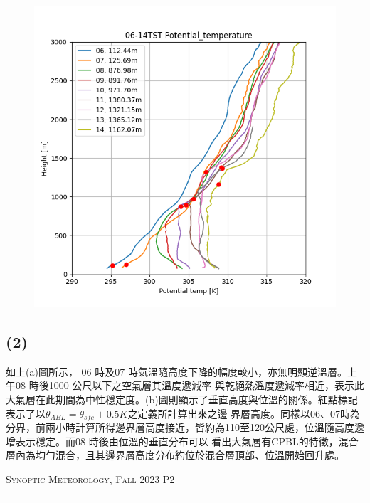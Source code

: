 \documentclass{article}
\begin{document}
\begin{CJK*}{UTF8}{bsmi}
\begin{figure}[!htbp]
{\begin{minipage}[t]{0.5\linewidth}
    \includegraphics[scale=0.47]{1_b.png}
    \end{minipage}%
    }%
\end{figure}



\subsection*{(2)}
\begin{spacing}{2}
    \begin{large}
        \qquad \;如上(a)圖所示， 06 時及07 時氣溫隨高度下降的幅度較小，亦無明顯逆溫層。上午08 時後1000 公尺以下之空氣層其溫度遞減率
        與乾絕熱溫度遞減率相近，表示此大氣層在此期間為中性穩定度。(b)圖則顯示了垂直高度與位溫的關係。紅點標記表示了以$ \theta_{ABL} = \theta_{sfc} + 0.5K $之定義所計算出來之邊
        界層高度。同樣以06、07時為分界，前兩小時計算所得邊界層高度接近，皆約為110至120公尺處，位溫隨高度遞增表示穩定。而08 時後由位溫的垂直分布可以
        看出大氣層有CPBL的特徵，混合層內為均勻混合，且其邊界層高度分布約位於混合層頂部、位溫開始回升處。
    \end{large}
\end{spacing}

\newpage
\thispagestyle{empty}
\hfill {\scshape \large Synoptic Meteorology, Fall 2023 } \hfill {\scshape P2}
\smallskip
\hrule
\bigskip

\end{CJK*}
\end{document}
